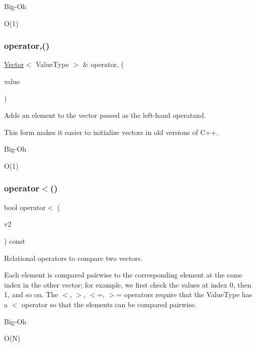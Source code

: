 \begin{DoxyRefDesc}{Big-\/\+Oh}
\item[\mbox{\hyperlink{BigOh__BigOh000140}{Big-\/\+Oh}}]O(1) \end{DoxyRefDesc}
\mbox{\label{classVector_ad2a2f86bb5857209608bbbfe1066c650}} 
\subsubsection{\texorpdfstring{operator,()}{operator,()}}
{\footnotesize\ttfamily \mbox{\hyperlink{classVector}{Vector}}$<$ Value\+Type $>$ \& operator, (\begin{DoxyParamCaption}\item[{const Value\+Type \&}]{value }\end{DoxyParamCaption})}



Adds an element to the vector passed as the left-\/hand operatand. 

This form makes it easier to initialize vectors in old versions of C++. \begin{DoxyRefDesc}{Big-\/\+Oh}
\item[\mbox{\hyperlink{BigOh__BigOh000147}{Big-\/\+Oh}}]O(1) \end{DoxyRefDesc}
\mbox{\label{classVector_a77901fd042b59d646be1da79b8339c5c}} 
\subsubsection{\texorpdfstring{operator$<$()}{operator<()}}
{\footnotesize\ttfamily bool operator$<$ (\begin{DoxyParamCaption}\item[{const \mbox{\hyperlink{classVector}{Vector}}$<$ Value\+Type $>$ \&}]{v2 }\end{DoxyParamCaption}) const}



Relational operators to compare two vectors. 

Each element is compared pairwise to the corresponding element at the same index in the other vector; for example, we first check the values at index 0, then 1, and so on. The $<$, $>$, $<$=, $>$= operators require that the Value\+Type has a $<$ operator so that the elements can be compared pairwise. \begin{DoxyRefDesc}{Big-\/\+Oh}
\item[\mbox{\hyperlink{BigOh__BigOh000143}{Big-\/\+Oh}}]O(\+N) \end{DoxyRefDesc}
\mbox{\label{classVector_ae70337b6c4c49dde850031de8b68c05d}} 
